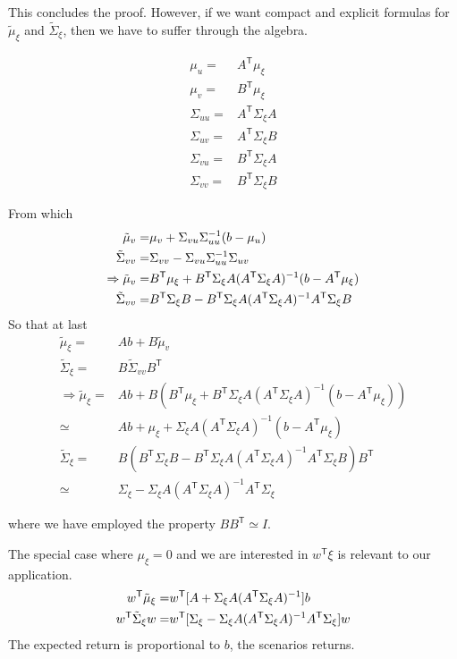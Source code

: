 \documentclass[letter, 12pt]{article}
\newcommand{\transpose}{^\mathsf{T}}
\newcommand{\inv}{^{-1}}
\begin{document}
This concludes the proof. However, if we want compact and explicit formulas for $\tilde \mu_\xi$ and $\tilde \Sigma_{\xi}$, then we have to suffer through the algebra.

\begin{align*}
\mu_u = & A\transpose \mu_\xi\\
\mu_v = & B\transpose\mu_\xi\\
\Sigma_{uu} = & A\transpose \Sigma_\xi A \\
\Sigma_{uv} = & A\transpose \Sigma_\xi B\\
\Sigma_{vu} = & B\transpose \Sigma_\xi A\\
\Sigma_{vv} = & B\transpose \Sigma_\xi B
\end{align*}

From which
\begin{align*}
\tilde\mu_v=&\mu_v + \Sigma_{vu} \Sigma_{uu}\inv(b-\mu_u) \notag \\
\tilde\Sigma_{vv}=& \Sigma_{vv} - \Sigma_{vu} \Sigma_{uu}\inv \Sigma_{uv} \\
\Rightarrow
\tilde\mu_v=& B\transpose\mu_\xi + B\transpose \Sigma_\xi A (A\transpose \Sigma_\xi A )\inv(b-A\transpose \mu_\xi) \\
\tilde\Sigma_{vv}=& B\transpose \Sigma_\xi B - B\transpose \Sigma_\xi A ( A\transpose \Sigma_\xi A) \inv A\transpose \Sigma_\xi B
\end{align*}
So that at last
\begin{align*}
\tilde \mu_\xi=& Ab + B \tilde\mu_v \\
\tilde \Sigma_{\xi}= & B\tilde\Sigma_{vv} B\transpose \\
\Rightarrow
\tilde\mu_\xi = & Ab + B(B\transpose\mu_\xi + B\transpose \Sigma_\xi A (A\transpose \Sigma_\xi A )\inv(b-A\transpose \mu_\xi))\\
\simeq & Ab + \mu_\xi + \Sigma_\xi A (A\transpose \Sigma_\xi A )\inv(b-A\transpose \mu_\xi) \\
\tilde \Sigma_{\xi} = & B (B\transpose \Sigma_\xi B - B\transpose \Sigma_\xi A ( A\transpose \Sigma_\xi A) \inv A\transpose \Sigma_\xi B) B\transpose\\
\simeq & \Sigma_\xi - \Sigma_\xi A ( A\transpose \Sigma_\xi A) \inv A\transpose \Sigma_\xi
\end{align*}

where we have employed the property $B B\transpose \simeq I$.

The special case where $\mu_\xi=0$ and we are interested in $w\transpose \xi$ is relevant to our application.
\begin{align}
w\transpose \tilde\mu_\xi = & w\transpose [A  + \Sigma_\xi A (A\transpose \Sigma_\xi A)\inv] b\label{eq:cond2}\\
w\transpose \tilde \Sigma_{\xi} w = & w\transpose [ \Sigma_\xi - \Sigma_\xi A ( A\transpose \Sigma_\xi A) \inv A\transpose \Sigma_\xi ] w\notag
\end{align}
The expected return is proportional to $b$, the scenarios returns.
\end{document}
